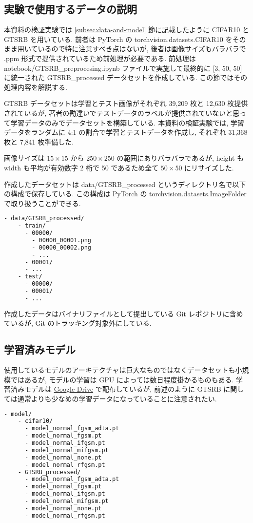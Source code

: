 \subsection{実験で使用するデータの説明}
\label{subsec:appendix-data}
本資料の検証実験では \ref{subsec:data-and-model} 節に記載したように CIFAR10 と GTSRB を用いている.
前者は PyTorch の torchvision.datasets.CIFAR10 をそのまま用いているので特に注意すべき点はないが, 後者は画像サイズもバラバラで .ppm 形式で提供されているため前処理が必要である.
前処理は notebook/GTSRB\_preprocesing.ipynb ファイルで実施して最終的に [3, 50, 50] に統一された GTSRB\_processed データセットを作成している.
この節ではその処理内容を解説する.

GTSRB データセットは学習とテスト画像がそれぞれ 39,209 枚と 12,630 枚提供されているが, 著者の勘違いでテストデータのラベルが提供されていないと思って学習データのみでデータセットを構築している.
本資料の検証実験では, 学習データをランダムに 4:1 の割合で学習とテストデータを作成し, それぞれ 31,368 枚と 7,841 枚準備した.

画像サイズは $15 \times 15$ から $250 \times 250$ の範囲にありバラバラであるが, height も width も平均が有効数字 2 桁で 50 であるため全て $50 \times 50$ にリサイズした.

作成したデータセットは data/GTSRB\_processed というディレクトリ名で以下の構成で保存している.
この構成は PyTorch の torchvision.datasets.ImageFolder で取り扱うことができる.
%
\begin{lstlisting}[language=bash]
  - data/GTSRB_processed/
    - train/
      - 00000/
        - 00000_00001.png
        - 00000_00002.png
        - ...
      - 00001/
      - ...
    - test/
      - 00000/
      - 00001/
      - ...
\end{lstlisting}
%

作成したデータはバイナリファイルとして提出している Git レポジトリに含めているが, Git のトラッキング対象外にしている.



\subsection{学習済みモデル}
\label{subsec:appendix-model}
使用しているモデルのアーキテクチャは巨大なものではなくデータセットも小規模ではあるが, モデルの学習は GPU によっては数日程度掛かるものもある.
学習済みモデルは \href{https://drive.google.com/drive/folders/1sJJ6WQ4X-Hdsoh1YVMVz05Hn5N6hzm0E?usp=sharing}{Google Drive} で配布しているが, 前述のように GTSRB に関しては通常よりも少なめの学習データになっていることに注意されたい.
%
\begin{lstlisting}[language=bash]
  - model/
    - cifar10/
      - model_normal_fgsm_adta.pt
      - model_normal_fgsm.pt
      - model_normal_ifgsm.pt
      - model_normal_mifgsm.pt
      - model_normal_none.pt
      - model_normal_rfgsm.pt
    - GTSRB_processed/
      - model_normal_fgsm_adta.pt
      - model_normal_fgsm.pt
      - model_normal_ifgsm.pt
      - model_normal_mifgsm.pt
      - model_normal_none.pt
      - model_normal_rfgsm.pt
\end{lstlisting}
%



